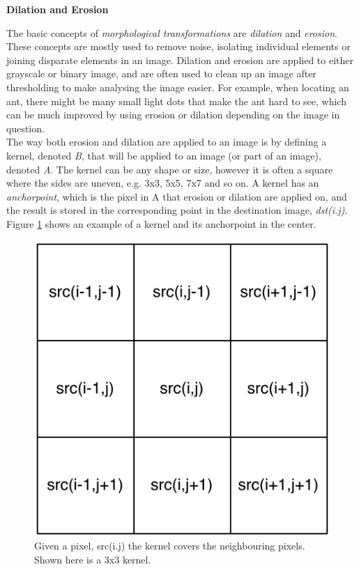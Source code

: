 \newpage

\noindent \textbf{Dilation and Erosion} \par

The basic concepts of \textit{morphological transformations} are \textit{dilation} and \textit{erosion}. These concepts are mostly used to remove noise, isolating individual elements or joining disparate elements in an image. Dilation and erosion are applied to either grayscale or binary image, and are often used to clean up an image after thresholding to make analysing the image easier. For example, when locating an ant, there might be many small light dots that make the ant hard to see, which can be much improved by using erosion or dilation depending on the image in question.\\

The way both erosion and dilation are applied to an image is by defining a kernel, denoted \textit{B}, that will be applied to an image (or part of an image), denoted \textit{A}. The kernel can be any shape or size, however it is often a square where the sides are uneven, e.g. 3x3, 5x5, 7x7 and so on. A kernel has an \textit{anchorpoint}, which is the pixel in A that erosion or dilation are applied on, and the result is stored in the corresponding point in the destination image, \textit{dst(i.j)}. Figure \ref{fig:kernel_ed} shows an example of a kernel and its anchorpoint in the center. \\

\begin{figure}[ht!]
  \centering
    \includegraphics[scale=0.50]{img/Kernel_ED.pdf}
  \caption{Given a pixel, src(i.j) the kernel covers the neighbouring pixels. Shown here is a 3x3 kernel.}
  \label{fig:kernel_ed}
\end{figure}

